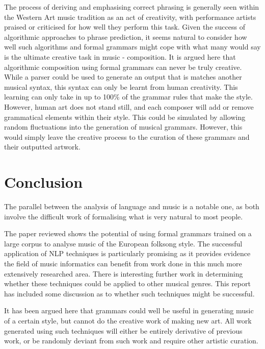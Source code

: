 \documentclass[a4paper,12pt]{article}
\begin{document}
The process of deriving and emphasising correct phrasing is generally seen within the Western Art music tradition as an act of creativity, with performance artists praised or criticised for how well they perform this task. Given the success of algorithmic approaches to phrase prediction, it seems natural to consider how well such algorithms and formal grammars might cope with what many would say is the ultimate creative task in music - composition. It is argued here that algorithmic composition using formal grammars can never be truly creative. While a parser could be used to generate an output that is matches another musical syntax, this syntax can only be learnt from human creativity. This learning can only take in up to 100\% of the grammar rules that make the style. However, human art does not stand still, and each composer will add or remove grammatical elements within their style. This could be simulated by allowing random fluctuations into the generation of musical grammars. However, this would simply leave the creative process to the curation of these grammars and their outputted artwork. 

\section{Conclusion}
The parallel between the analysis of language and music is a notable one, as both involve the difficult work of formalising what is very natural to most people. 

The paper reviewed shows the potential of using formal grammars trained on a large corpus to analyse music of the European folksong style. The successful application of NLP techniques is particularly promising as it provides evidence the field of music informatics can benefit from work done in this much more extensively researched area. There is interesting further work in determining whether these techniques could be applied to other musical genres. This report has included some discussion as to whether such techniques might be successful.

It has been argued here that grammars could well be useful in generating music of a certain style, but cannot do the creative work of making new art. All work generated using such techniques will either be entirely derivative of previous work, or be randomly deviant from such work and require other artistic curation.



\end{document}
